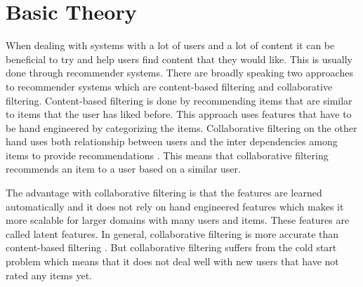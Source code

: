 \section{Basic Theory}
When dealing with systems with a lot of users and a lot of content it can be beneficial to try and help users find content that they would like.
This is usually done through recommender systems.
There are broadly speaking two approaches to recommender systems which are content-based filtering and collaborative filtering.
Content-based filtering is done by recommending items that are similar to items that the user has liked before.
This approach uses features that have to be hand engineered by categorizing the items.
Collaborative filtering on the other hand uses both relationship between users and the inter dependencies among items to provide recommendations \cite{Matrix-factorization-techniques}. 
This means that collaborative filtering recommends an item to a user based on a similar user.

The advantage with collaborative filtering is that the features are learned automatically and it does not rely on hand engineered features which makes it more scalable for larger domains with many users and items.
These features are called latent features.
In general, collaborative filtering is more accurate than content-based filtering \cite{Matrix-factorization-techniques}.
But collaborative filtering suffers from the cold start problem which means that it does not deal well with new users that have not rated any items yet.

